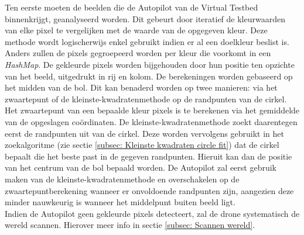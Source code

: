 \noindent
Ten eerste moeten de beelden die de Autopilot van de Virtual Testbed binnenkrijgt, geanalyseerd worden. Dit gebeurt door iteratief de kleurwaarden van elke pixel te vergelijken met de waarde van de opgegeven kleur. Deze methode wordt logischerwijs enkel gebruikt indien er al een doelkleur beslist is. Anders zullen de pixels gegroepeerd worden per kleur die voorkomt in een \textit{HashMap}. De gekleurde pixels worden bijgehouden door hun positie ten opzichte van het beeld, uitgedrukt in rij en kolom. De berekeningen worden gebaseerd op het midden van de bol. Dit kan benaderd worden op twee manieren: via het zwaartepunt of de kleinste-kwadratenmethode op de randpunten van de cirkel. Het zwaartepunt van een bepaalde kleur pixels is te berekenen via het gemiddelde van de opgeslagen co\"ordinaten. De kleinste-kwadratenmethode zoekt daarentegen eerst de randpunten uit van de cirkel. Deze worden vervolgens gebruikt in het zoekalgoritme (zie sectie \ref{subsec: Kleinste kwadraten circle fit}) dat de cirkel bepaalt die het beste past in de gegeven randpunten. Hieruit kan dan de positie van het centrum van de bol bepaald worden. De Autopilot zal eerst gebruik maken van de kleinste-kwadratenmethode en overschakelen op de zwaartepuntberekening wanneer er onvoldoende randpunten zijn, aangezien deze minder nauwkeurig is wanneer het middelpunt buiten beeld ligt.
\\
Indien de Autopilot geen gekleurde pixels detecteert, zal de drone systematisch de wereld scannen. Hierover meer info in sectie \ref{subsec: Scannen wereld}.